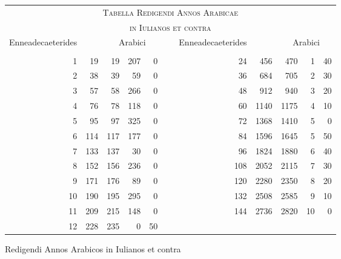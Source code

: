 %
\begin{tabnums} %
\normalsize
\centering
\setlength{\tabcolsep}{1.0ex}
%
\newcommand{\cwd}{3.2em}
\newcommand{\da}{{\scriptsize †}}
\newcommand{\db}{{\scriptsize ‡}}
\newcommand{\ang}{90}
\newcommand{\hsa}[1]{\scriptsize{#1}}
\newcommand{\hsb}[1]{\tiny{#1}}
\newcommand{\hdrA}{%
  \multirow{2}{*}{\settowidth{\cw}{888}\parbox[b][32pt][b]{\cw}{\raggedright\hsb{Ennea\-deca\-e\-te\-ri\-des}}} &
  &
  \multicolumn{3}{c}{\hsa{Arabici}}
}
%
\newcommand{\hdrB}{%
  &
  \ch{8888}{\hsb{Anni Iuliani}}&
  \ch{8888}{\hsb{Anni Arabici}} &
  \hsb{\ch{Dies}{Dies}} &
  \hsb{\ch{Scrupux}{Scrupu\-li~diei}} 
}
%
\newcommand{\hdrs}{%
 \hdrA & & \hdrA \\
 \cmidrule(lr){3-5} \cmidrule(l){9-11}
 \hdrB & & \hdrB \\
 \cmidrule(l){1-5} \cmidrule(l){7-11}
}
%
\begin{tabular}[c]{@{} rrrrr c rrrrr @{}}
\toprule
\multicolumn{11}{c}{\Large\textsc{Tabella Redigendi Annos Arabicae}} \\
\multicolumn{11}{c}{\large\textsc{in Iulianos et contra}} \\
\toprule
\hdrs %
  1 &  19 &  19 & 207 &  0 &~&  24 &  456 &  470 &  1 & 40\\
  2 &  38 &  39 &  59 &  0 &~&  36 &  684 &  705 &  2 & 30\\
  3 &  57 &  58 & 266 &  0 &~&  48 &  912 &  940 &  3 & 20\\
  4 &  76 &  78 & 118 &  0 &~&  60 & 1140 & 1175 &  4 & 10\\
  5 &  95 &  97 & 325 &  0 &~&  72 & 1368 & 1410 &  5 &  0\\
  6 & 114 & 117 & 177 &  0 &~&  84 & 1596 & 1645 &  5 & 50\\
  7 & 133 & 137 &  30 &  0 &~&  96 & 1824 & 1880 &  6 & 40\\
  8 & 152 & 156 & 236 &  0 &~& 108 & 2052 & 2115 &  7 & 30\\
  9 & 171 & 176 &  89 &  0 &~& 120 & 2280 & 2350 &  8 & 20\\
 10 & 190 & 195 & 295 &  0 &~& 132 & 2508 & 2585 &  9 & 10\\
 11 & 209 & 215 & 148 &  0 &~& 144 & 2736 & 2820 & 10 &  0\\
 12 & 228 & 235 &   0 & 50 &~&     &    &    &    &  \\
\bottomrule
\end{tabular}
\caption{Redigendi Annos Arabicos in Iulianos et contra}
\label{tab:p141a}
\end{tabnums}
